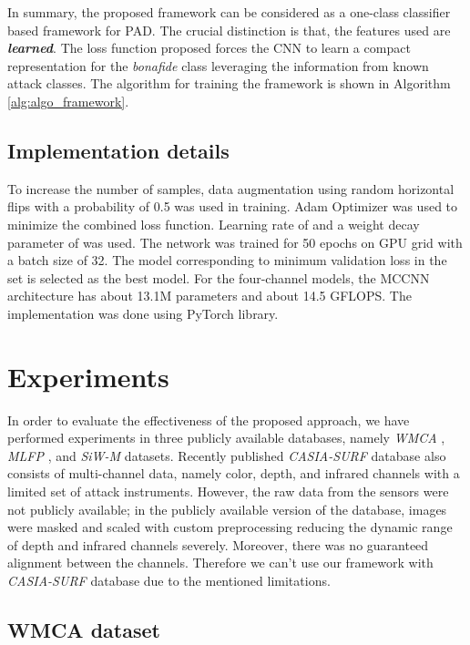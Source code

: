 \documentclass[journal]{IEEEtran}
\begin{document}
In summary, the proposed framework can be considered as a one-class classifier based framework for PAD. The crucial distinction is that, the features used are \textit{\textbf{learned}}. The loss function proposed forces the CNN to learn a compact representation for the \textit{bonafide} class leveraging the information from known attack classes. The algorithm for training the framework is shown in Algorithm \ref{alg:algo_framework}.

\subsection{Implementation details}

To increase the number of samples, data augmentation using random horizontal flips with a probability of 0.5 was used in training. Adam Optimizer \cite{kingma2014adam} was used to minimize the combined loss function. Learning rate of  and a weight decay parameter of   was used. The network was trained for 50 epochs on GPU grid with a batch size of 32. The model corresponding to minimum validation loss in the  set is selected as the best model. For the four-channel models, the MCCNN architecture has about 13.1M parameters and about 14.5 GFLOPS. The implementation was done using PyTorch \cite{paszke2017automatic} library.


\section{Experiments}

In order to evaluate the effectiveness of the proposed approach, we have performed experiments in three publicly available databases, namely \textit{WMCA} \cite{george_mccnn_tifs2019}, \textit{MLFP} \cite{agarwal2017face}, and \textit{SiW-M} \cite{Liu_2019_CVPR} datasets.
Recently published \textit{CASIA-SURF} \cite{zhang2018casia} database also consists of multi-channel data, namely color, depth, and infrared channels with a limited set of attack instruments. However, the raw data from the sensors were not publicly available; in the publicly available version of the database, images were masked and scaled with custom preprocessing reducing the dynamic range of depth and infrared channels severely. Moreover, there was no guaranteed alignment between the channels. Therefore we can't use our framework with \textit{CASIA-SURF} database due to the mentioned limitations.

\subsection{WMCA dataset}
\end{document}
